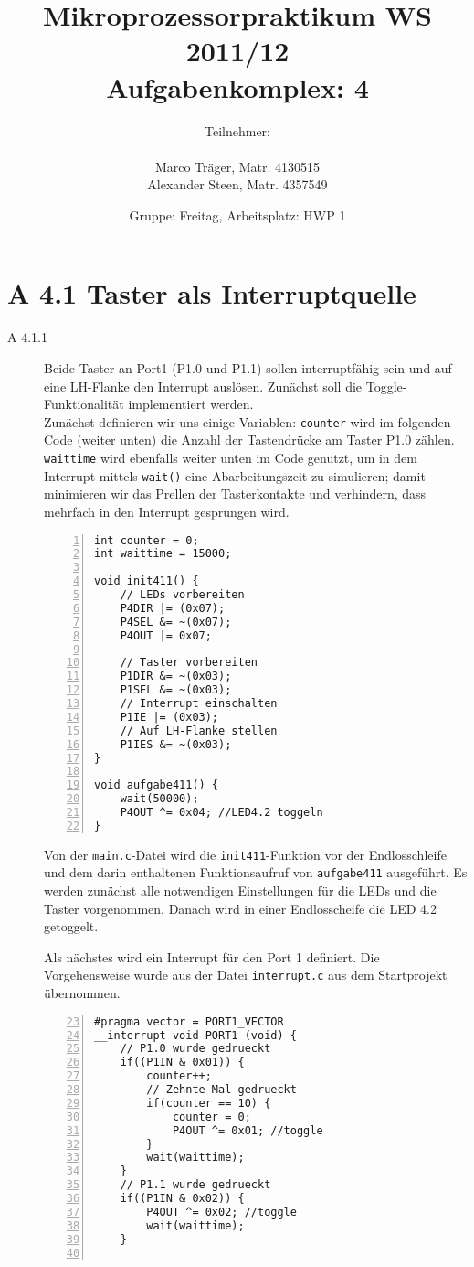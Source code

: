 \documentclass[11pt,a4paper,ngerman]{article}
\author{Teilnehmer:\\ \\Marco Träger, Matr. 4130515\\Alexander Steen, Matr. 4357549}
\date{Gruppe: Freitag, Arbeitsplatz: HWP 1}
\title{Mikroprozessorpraktikum WS 2011/12\\ Aufgabenkomplex: 4}
\begin{document}

\maketitle
\thispagestyle{fancy}
\newpage
\section*{A 4.1 Taster als Interruptquelle}

\begin{description}
	\item[A 4.1.1] Beide Taster an Port1 (P1.0 und P1.1) sollen interruptfähig sein und auf eine LH-Flanke den Interrupt auslösen. Zunächst soll die Toggle-Funktionalität implementiert werden. \\

Zunächst definieren wir uns einige Variablen: \texttt{counter} wird im folgenden Code (weiter unten) die Anzahl der Tastendrücke am Taster P1.0 zählen. \texttt{waittime} wird ebenfalls weiter unten im Code genutzt, um in dem Interrupt mittels \texttt{wait()} eine Abarbeitungszeit zu simulieren; damit minimieren wir das Prellen der Tasterkontakte und verhindern, dass mehrfach in den Interrupt gesprungen wird.
\begin{lstlisting}[numbers=left]
int counter = 0;
int waittime = 15000;

void init411() {
	// LEDs vorbereiten
	P4DIR |= (0x07);
	P4SEL &= ~(0x07);
	P4OUT |= 0x07;
	
	// Taster vorbereiten
	P1DIR &= ~(0x03);
	P1SEL &= ~(0x03);
	// Interrupt einschalten 
	P1IE |= (0x03);
	// Auf LH-Flanke stellen
	P1IES &= ~(0x03);
}

void aufgabe411() {
	wait(50000);
	P4OUT ^= 0x04; //LED4.2 toggeln
}
\end{lstlisting}
Von der \texttt{main.c}-Datei wird die \texttt{init411}-Funktion vor der Endlosschleife und dem darin enthaltenen Funktionsaufruf von \texttt{aufgabe411} ausgeführt. Es werden zunächst alle notwendigen Einstellungen für die LEDs und die Taster vorgenommen. Danach wird in einer Endlosscheife die LED 4.2 getoggelt.

Als nächstes wird ein Interrupt für den Port 1 definiert. Die Vorgehensweise wurde aus der Datei \texttt{interrupt.c} aus dem Startprojekt übernommen.
\begin{lstlisting}[numbers=left,firstnumber=23]
#pragma vector = PORT1_VECTOR
__interrupt void PORT1 (void) {
	// P1.0 wurde gedrueckt
	if((P1IN & 0x01)) {
		counter++;
		// Zehnte Mal gedrueckt
		if(counter == 10) {
			counter = 0;
			P4OUT ^= 0x01; //toggle
		}
		wait(waittime);
	}
	// P1.1 wurde gedrueckt
	if((P1IN & 0x02)) {
		P4OUT ^= 0x02; //toggle
		wait(waittime);
	}
	

\end{lstlisting}
\end{description}
\end{document}
